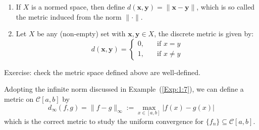 \begin{example}
\begin{enumerate}
\item
If $X$ is a normed space, then define $d(\bm x,\bm y)=\|\bm x-\bm y\|$, which is so called the metric induced from the norm $\|\cdot\|$.
\item
Let $X$ be any (non-empty) set with $\bm x,\bm y\in X$, the discrete metric is given by:
\[
d(\bm x,\bm y)=\left\{
\begin{aligned}
0,&\quad\mbox{if }x=y\\
1,&\quad\mbox{if }x\ne y
\end{aligned}
\right.
\]
\end{enumerate}
Exercise: check the metric space defined above are well-defined.
\end{example}
\begin{remark}
Adopting the infinite norm discussed in Example~(\ref{Exp:1:7}), we can define a metric on $\mathcal{C}[a,b]$ by
\[
d_\infty(f,g)=\|f-g\|_\infty:=\max_{x\in[a,b]}|f(x)-g(x)|
\]
which is the correct metric to study the uniform convergence for $\{f_n\}\subseteq\mathcal{C}[a,b]$.
\end{remark}

